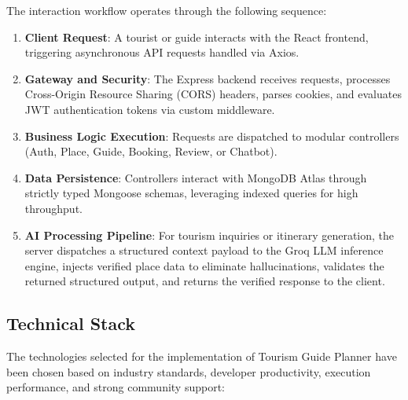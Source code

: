 \documentclass[12pt,a4paper,twoside,openright]{report}
\begin{document}
The interaction workflow operates through the following sequence:
\begin{enumerate}[leftmargin=*]
    \item \textbf{Client Request}: A tourist or guide interacts with the React frontend, triggering asynchronous API requests handled via Axios.
    \item \textbf{Gateway and Security}: The Express backend receives requests, processes Cross-Origin Resource Sharing (CORS) headers, parses cookies, and evaluates JWT authentication tokens via custom middleware.
    \item \textbf{Business Logic Execution}: Requests are dispatched to modular controllers (Auth, Place, Guide, Booking, Review, or Chatbot).
    \item \textbf{Data Persistence}: Controllers interact with MongoDB Atlas through strictly typed Mongoose schemas, leveraging indexed queries for high throughput.
    \item \textbf{AI Processing Pipeline}: For tourism inquiries or itinerary generation, the server dispatches a structured context payload to the Groq LLM inference engine, injects verified place data to eliminate hallucinations, validates the returned structured output, and returns the verified response to the client.
\end{enumerate}

\subsection{Technical Stack}

The technologies selected for the implementation of Tourism Guide Planner have been chosen based on industry standards, developer productivity, execution performance, and strong community support:
\end{document}
